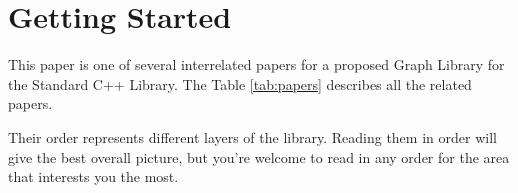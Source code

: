 
\section{Getting Started}

This paper is one of several interrelated papers for a proposed Graph Library for the Standard C++ Library. 
The Table \ref{tab:papers} describes all the related papers. 

Their order represents different layers of the library. Reading them in order will give the best overall picture, 
but you're welcome to read in any order for the area that interests you the most.


